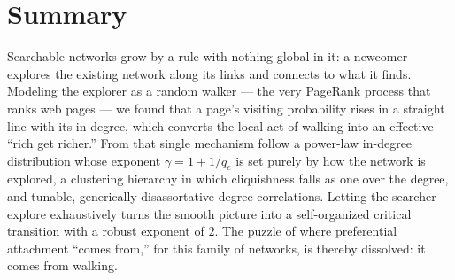 \section{Summary}

Searchable networks grow by a rule with nothing global in it: a newcomer
explores the existing network along its links and connects to what it finds.
Modeling the explorer as a random walker --- the very PageRank process that ranks
web pages --- we found that a page's visiting probability rises in a straight line
with its in-degree, which converts the local act of walking into an effective
``rich get richer.'' From that single mechanism follow a power-law in-degree
distribution whose exponent $\gamma=1+1/q_e$ is set purely by how the network is
explored, a clustering hierarchy in which cliquishness falls as one over the
degree, and tunable, generically disassortative degree correlations. Letting the
searcher explore exhaustively turns the smooth picture into a self-organized
critical transition with a robust exponent of $2$. The puzzle of where
preferential attachment ``comes from,'' for this family of networks, is thereby
dissolved: it comes from walking.
